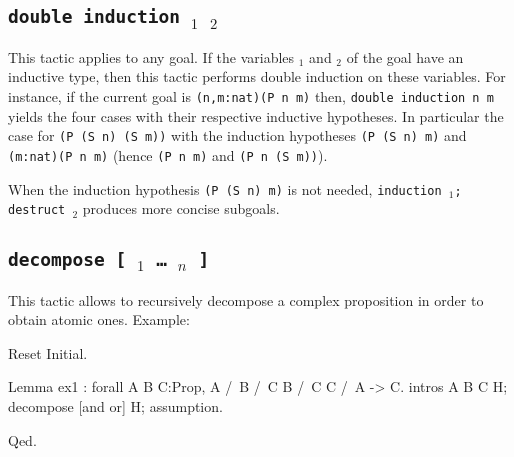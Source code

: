 
\subsection {\tt double induction \ident$_1$ \ident$_2$}
This tactic applies to any goal. If the variables {\ident$_1$} and {\ident$_2$}
of the goal have an inductive type, then this tactic
performs double induction on these variables.
For instance, if the current goal is \verb+(n,m:nat)(P n m)+ then,
{\tt double induction n m} yields the four cases with their respective
inductive hypotheses. In particular the case for
\verb+(P (S n) (S m))+
with the induction hypotheses \verb+(P (S n) m)+ and 
\verb+(m:nat)(P n m)+ (hence \verb+(P n m)+ and \verb+(P n (S m))+).

\Rem When the induction hypothesis \verb+(P (S n) m)+ is not
needed, {\tt induction \ident$_1$; destruct \ident$_2$} produces
more concise subgoals.


\subsection{\tt decompose [ {\ident$_1$} \dots\ {\ident$_n$} ] \term}
\label{decompose}
This tactic allows to recursively decompose a
complex proposition in order to obtain atomic ones.
Example: 

\begin{coq_eval}
Reset Initial.
\end{coq_eval}
\begin{coq_example}
Lemma ex1 : forall A B C:Prop, A /\ B /\ C \/ B /\ C \/ C /\ A -> C.
intros A B C H; decompose [and or] H; assumption.
\end{coq_example}
\begin{coq_example*}
Qed.
\end{coq_example*}

